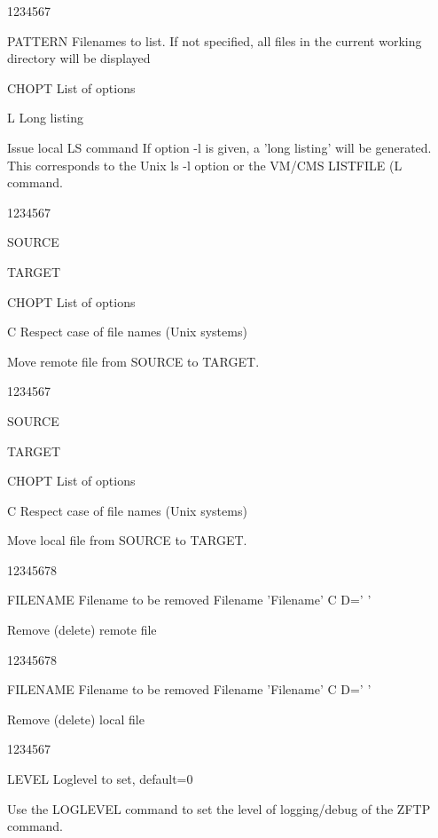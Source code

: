 \begin{DLtt}{1234567}
\item[PATTERN]Filenames to list. If not specified, all files in the
current working directory will be displayed
\item[CHOPT]List of options
\begin{DLtt}{12}
\item[L]Long listing
\end{DLtt}
\end{DLtt}
Issue local LS command
If option -l is given, a 'long listing' will be generated.
This corresponds to the Unix ls -l option or the VM/CMS
LISTFILE (L command.

\begin{DLtt}{1234567}
\item[SOURCE]
\item[TARGET]
\item[CHOPT]List of options
\begin{DLtt}{12}
\item[C]Respect case of file names (Unix systems)
\end{DLtt}
\end{DLtt}
Move remote file from SOURCE to TARGET.

\begin{DLtt}{1234567}
\item[SOURCE]
\item[TARGET]
\item[CHOPT]List of options
\begin{DLtt}{12}
\item[C]Respect case of file names (Unix systems)
\end{DLtt}
\end{DLtt}
Move local file from SOURCE to TARGET.

\begin{DLtt}{12345678}
\item[FILENAME]Filename to be removed
Filename 'Filename' C D=' '
\end{DLtt}
Remove (delete) remote file

\begin{DLtt}{12345678}
\item[FILENAME]Filename to be removed
Filename 'Filename' C D=' '
\end{DLtt}
Remove (delete) local file
\begin{DLtt}{1234567}
\item[LEVEL]Loglevel to set, default=0
\end{DLtt}
Use the LOGLEVEL command to set the level of logging/debug of
the ZFTP command.

